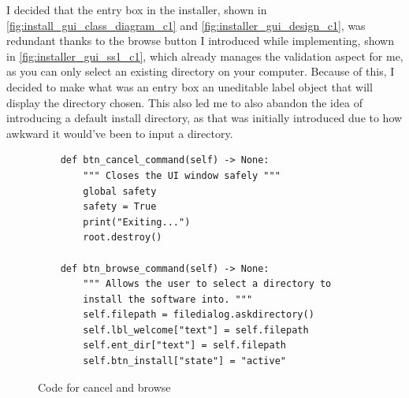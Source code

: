 \documentclass[11pt]{article}
\begin{document}
                I decided that the entry box in the installer, shown in \autoref{fig:install_gui_class_diagram_c1} and \autoref{fig:installer_gui_design_c1}, was redundant thanks to the browse button I introduced while implementing, shown in \autoref{fig:installer_gui_ss1_c1}, which already manages the validation aspect for me, as you can only select an existing directory on your computer. Because of this, I decided to make what was an entry box an uneditable label object that will display the directory chosen. This also led me to also abandon the idea of introducing a default install directory, as that was initially introduced due to how awkward it would've been to input a directory.

                \begin{figure}[!ht]
                    \begin{verbatim}
    def btn_cancel_command(self) -> None:
        """ Closes the UI window safely """
        global safety
        safety = True
        print("Exiting...")
        root.destroy()

    def btn_browse_command(self) -> None:
        """ Allows the user to select a directory to 
        install the software into. """
        self.filepath = filedialog.askdirectory()
        self.lbl_welcome["text"] = self.filepath
        self.ent_dir["text"] = self.filepath
        self.btn_install["state"] = "active"
                    \end{verbatim}
                    \caption{Code for cancel and browse}
                    \label{sc:cancel_and_browse_btns_sc_c1}
                \end{figure}
\end{document}
